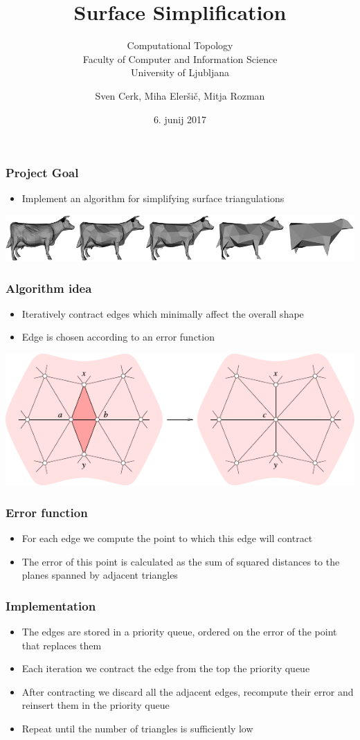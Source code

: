\documentclass{beamer}
\title{Surface Simplification}
\subtitle{Computational Topology \\
Faculty of Computer and Information Science\\
University of Ljubljana}
\author{Sven Cerk, Miha Eleršič, Mitja Rozman}
\date{6. junij 2017}
\begin{document}
\frame{\titlepage}

\begin{frame}
\frametitle{Project Goal}
\begin{itemize}
    \item{Implement an algorithm for simplifying surface triangulations}
\end{itemize}
\vspace{1cm}
\includegraphics[width=\textwidth]{img/krava.pdf}
\end{frame}

\begin{frame}
\frametitle{Algorithm idea}
\begin{itemize}
    \item{Iteratively contract edges which minimally affect the overall shape}
    \item{Edge is chosen according to an error function}
\end{itemize}
\includegraphics[width=\textwidth]{img/drawing.pdf}
\end{frame}

\begin{frame}
\frametitle{Error function}
\begin{itemize}
  \item{For each edge we compute the point to which this edge will contract}
  \item{The error of this point is calculated as the sum of squared distances to the planes spanned by adjacent triangles}
\end{itemize}
\end{frame}

\begin{frame}
\frametitle{Implementation}
\begin{itemize}
  \item{The edges are stored in a priority queue, ordered on the error of the point that replaces them}
  \item{Each iteration we contract the edge from the top the priority queue}
  \item{After contracting we discard all the adjacent edges, recompute their error and reinsert them in the priority queue}
  \item{Repeat until the number of triangles is sufficiently low}
\end{itemize}
\end{frame}
\end{document}
